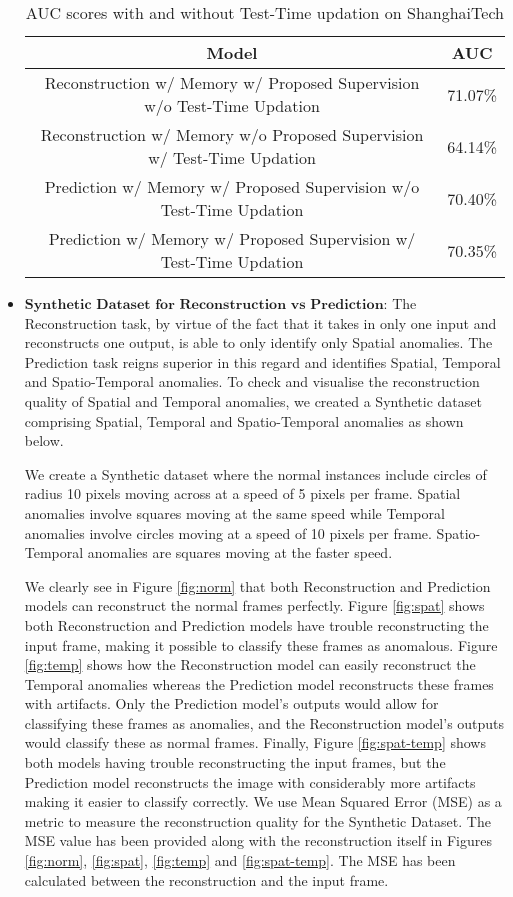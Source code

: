 \begin{itemize}
    \begin{table}[h]
    \centering
    \begin{tabular}{|c|c|}
    \hline
    Model                                                                   & AUC     \\ \hline
    Reconstruction w/ Memory w/ Proposed Supervision w/o Test-Time Updation & 71.07\% \\ \hline
    Reconstruction w/ Memory w/o Proposed Supervision w/ Test-Time Updation & 64.14\% \\ \hline
    Prediction w/ Memory w/ Proposed Supervision w/o Test-Time Updation     & 70.40\% \\ \hline
    Prediction w/ Memory w/ Proposed Supervision w/ Test-Time Updation      & 70.35\% \\ \hline
    \end{tabular}
    \caption{AUC scores with and without Test-Time updation on ShanghaiTech\cite{Luo2017ARO}}
    \label{tab:w-wo-ttu}
    \end{table}
    \item $\textbf{Synthetic Dataset for Reconstruction vs Prediction}$: The Reconstruction task, by virtue of the fact that it takes in only one input and reconstructs one output, is able to only identify only Spatial anomalies. The Prediction task reigns superior in this regard and identifies Spatial, Temporal and Spatio-Temporal anomalies. To check and visualise the reconstruction quality of Spatial and Temporal anomalies, we created a Synthetic dataset comprising Spatial, Temporal and Spatio-Temporal anomalies as shown below.
    
    We create a Synthetic dataset where the normal instances include circles of radius 10 pixels moving across at a speed of 5 pixels per frame. Spatial anomalies involve squares moving at the same speed while Temporal anomalies involve circles moving at a speed of 10 pixels per frame. Spatio-Temporal anomalies are squares moving at the faster speed.
    
    We clearly see in Figure \ref{fig:norm} that both Reconstruction and Prediction models can reconstruct the normal frames perfectly. Figure \ref{fig:spat} shows both Reconstruction and Prediction models have trouble reconstructing the input frame, making it possible to classify these frames as anomalous. Figure \ref{fig:temp} shows how the Reconstruction model can easily reconstruct the Temporal anomalies whereas the Prediction model reconstructs these frames with artifacts. Only the Prediction model's outputs would allow for classifying these frames as anomalies, and the Reconstruction model's outputs would classify these as normal frames. Finally, Figure \ref{fig:spat-temp} shows both models having trouble reconstructing the input frames, but the Prediction model reconstructs the image with considerably more artifacts making it easier to classify correctly. We use Mean Squared Error (MSE) as a metric to measure the reconstruction quality for the Synthetic Dataset. The MSE value has been provided along with the reconstruction itself in Figures \ref{fig:norm}, \ref{fig:spat}, \ref{fig:temp} and \ref{fig:spat-temp}. The MSE has been calculated between the reconstruction and the input frame.
    

\end{itemize}
